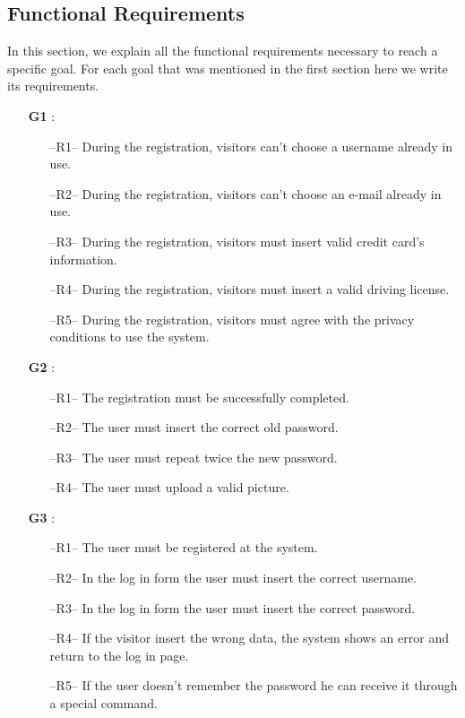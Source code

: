 \subsection{Functional Requirements} \label{sec:funct_requirements}
In this section, we explain all the functional requirements necessary to reach a specific goal. For each goal that was mentioned in the first section here we write its requirements.
\begin{itemize}
\item[\textbf{G1}]: 
\begin{itemize}
\item[--R1--] During the registration, visitors can't choose a username already in use.
\item[--R2--] During the registration, visitors can't choose an e-mail already in use.
\item[--R3--] During the registration, visitors must insert valid credit card's information.
\item[--R4--] During the registration, visitors must insert a valid driving license.
\item[--R5--] During the registration, visitors must agree with the privacy conditions to use the system.
\end{itemize}

\item[\textbf{G2}]:
\begin{itemize}
\item[--R1--] The registration must be successfully completed.
\item[--R2--] The user must insert the correct old password.
\item[--R3--] The user must repeat twice the new password.
\item[--R4--] The user must upload a valid picture.
\end{itemize}

\item[\textbf{G3}]:
\begin{itemize}
\item[--R1--] The user must be registered at the system.
\item[--R2--] In the log in form the user must insert the correct username.
\item[--R3--] In the log in form the user must insert the correct password.
\item[--R4--] If the visitor insert the wrong data, the system shows an error and return to the log in page.
\item[--R5--] If the user doesn't remember the password he can receive it through a special command.
\end{itemize}


\end{itemize}
